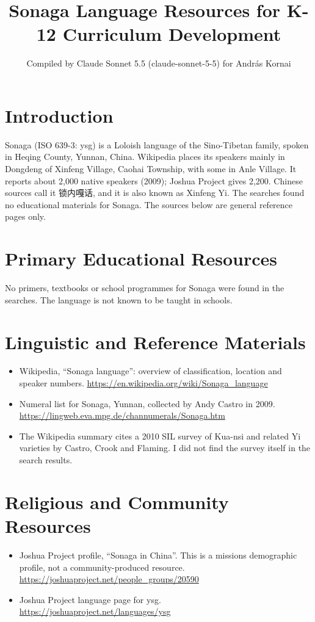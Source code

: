 \documentclass[12pt]{article}
\title{Sonaga Language Resources for K-12 Curriculum Development}
\author{Compiled by Claude Sonnet 5.5 (claude-sonnet-5-5) for Andr\'as Kornai}
\date{}
\begin{document}
\maketitle

\section{Introduction}
Sonaga (ISO 639-3: ysg) is a Loloish language of the Sino-Tibetan family, spoken in Heqing County, Yunnan, China. Wikipedia places its speakers mainly in Dongdeng of Xinfeng Village, Caohai Township, with some in Anle Village. It reports about 2,000 native speakers (2009); Joshua Project gives 2,200. Chinese sources call it 锁内嘎话, and it is also known as Xinfeng Yi. The searches found no educational materials for Sonaga. The sources below are general reference pages only.

\section{Primary Educational Resources}
No primers, textbooks or school programmes for Sonaga were found in the searches. The language is not known to be taught in schools.

\section{Linguistic and Reference Materials}
\begin{itemize}
\item Wikipedia, ``Sonaga language'': overview of classification, location and speaker numbers. \url{https://en.wikipedia.org/wiki/Sonaga_language}
\item Numeral list for Sonaga, Yunnan, collected by Andy Castro in 2009. \url{https://lingweb.eva.mpg.de/channumerals/Sonaga.htm}
\item The Wikipedia summary cites a 2010 SIL survey of Kua-nsi and related Yi varieties by Castro, Crook and Flaming. I did not find the survey itself in the search results.
\end{itemize}

\section{Religious and Community Resources}
\begin{itemize}
\item Joshua Project profile, ``Sonaga in China''. This is a missions demographic profile, not a community-produced resource. \url{https://joshuaproject.net/people_groups/20590}
\item Joshua Project language page for ysg. \url{https://joshuaproject.net/languages/ysg}
\end{itemize}
\end{document}
